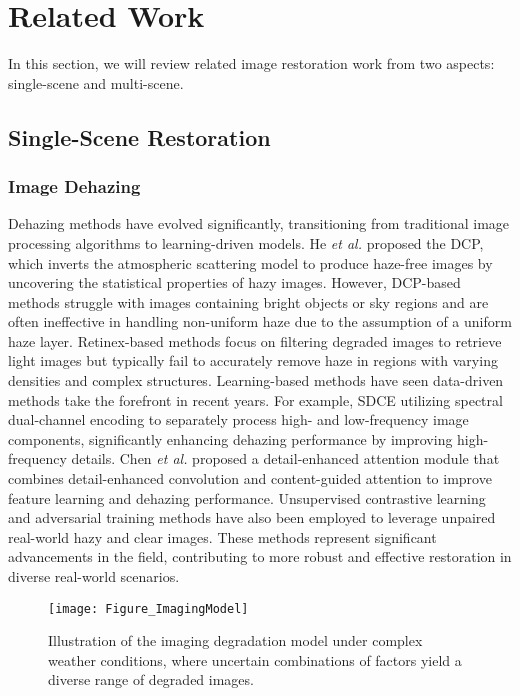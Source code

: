 \documentclass[final,12pt]{elsarticle}
\begin{document}
\section{Related Work}\label{sec:relatedwork}
%
    In this section, we will review related image restoration work from two aspects: single-scene and multi-scene.
%

\subsection{Single-Scene Restoration}
%
\subsubsection{Image Dehazing}
%
    Dehazing methods have evolved significantly, transitioning from traditional image processing algorithms to learning-driven models. He \textit{et al.} \citep{he2010single} proposed the DCP, which inverts the atmospheric scattering model to produce haze-free images by uncovering the statistical properties of hazy images. However, DCP-based methods \citep{fattal2014dehazing,liu2022rank} struggle with images containing bright objects or sky regions and are often ineffective in handling non-uniform haze due to the assumption of a uniform haze layer. Retinex-based methods \citep{fu2014retinex,kandhway2023adaptive} focus on filtering degraded images to retrieve light images but typically fail to accurately remove haze in regions with varying densities and complex structures. Learning-based methods \citep{zhu2023spectral,chen2024dea} have seen data-driven methods take the forefront in recent years. For example, SDCE \citep{zhu2023spectral} utilizing spectral dual-channel encoding to separately process high- and low-frequency image components, significantly enhancing dehazing performance by improving high-frequency details. Chen \textit{et al.} \citep{chen2024dea} proposed a detail-enhanced attention module that combines detail-enhanced convolution and content-guided attention to improve feature learning and dehazing performance. Unsupervised contrastive learning and adversarial training methods \citep{liu2024dfp} have also been employed to leverage unpaired real-world hazy and clear images. These methods represent significant advancements in the field, contributing to more robust and effective restoration in diverse real-world scenarios.
%
    \begin{figure}[t]
        \centering
        \setlength{\abovecaptionskip}{0.cm}
        \texttt{[image: Figure\_ImagingModel]}
        \caption{Illustration of the imaging degradation model under complex weather conditions, where uncertain combinations of factors yield a diverse range of degraded images.}
        \label{Figure_ImagingModel}
    \end{figure}
\end{document}
